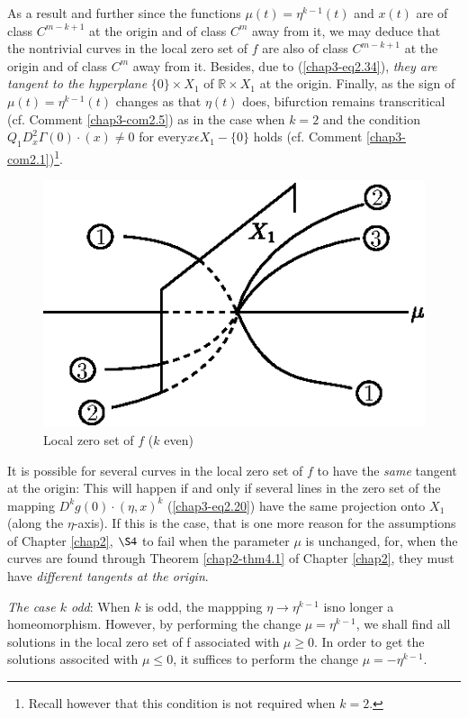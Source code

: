 As a result and further since the functions $\mu(t) = \eta^{k-1}(t)$
and $x(t)$ are of class $C^{m-k+1}$ at the origin and of class $C^{m}$
away from it, we may deduce that the nontrivial curves in the local
zero set of $f$ are also of class $C^{m-k+1}$ at the origin and of class
$C^{m}$ away from it. Besides, due to (\ref{chap3-eq2.34}), {\em they
  are tangent to the hyperplane} $\{0\} \times X_{1}$ of $\mathbb{R}
\times X_{1}$ at the origin. Finally, as the sign of $\mu(t) =
\eta^{k-1}(t)$ changes as that $\eta(t)$ does, bifurction remains
transcritical (cf. Comment \ref{chap3-com2.5}) as in the case when $k
= 2$ and the condition $Q_{1}D_{x}^{2}\Gamma(0) \cdot (x) \neq 0$ for
every\pageoriginale $x \epsilon X_{1} - \{0\}$ holds (cf. Comment
\ref{chap3-com2.1})\footnote{Recall however that this condition is not
required when $k = 2$.}.
\begin{figure}[H]
\centering
\includegraphics{figure/fig76-2.3.eps}
\caption{Local zero set of $f$ ($k$ even)}
\end{figure}


\begin{remark}\label{chap3-rem2.4}
It is possible for several curves in the local zero set of $f$ to have
the {\em same} tangent at the origin: This will happen if and only if
several lines in the zero set of the mapping $D^{k}g(0) \cdot (\eta,
x)^{k}$ (\ref{chap3-eq2.20}) have the same projection onto $X_{1}$
(along the $\eta$-axis). If this is the case, that is one more reason
for the assumptions of Chapter \ref{chap2}, $\S 4$ to fail when the
parameter $\mu$ is unchanged, for, when the curves are found through
Theorem \ref{chap2-thm4.1} of Chapter \ref{chap2}, they must have {\em
different tangents at the origin}.
\end{remark}

{\em The case $k$ odd}: When $k$ is odd, the mappping $\eta \to
\eta^{k-1}$ is\pageoriginale no longer a homeomorphism. However, by
performing the change $\mu = \eta^{k-1}$, we shall find all solutions
in the local zero set of f associated with $\mu \geq 0$. In order to
get the solutions associted with $\mu \leq 0$, it suffices to perform
the change $\mu = -\eta^{k-1}$.


